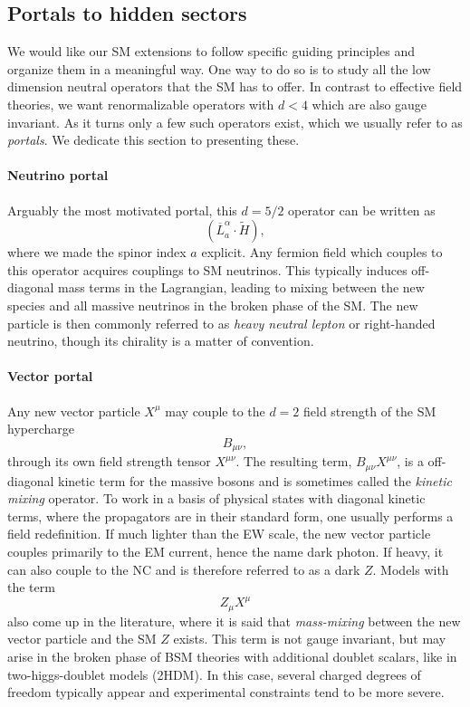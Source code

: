 \subsection{Portals to hidden sectors}

We would like our SM extensions to follow specific guiding principles and organize them in a meaningful way. One way to do so is to study all the low dimension neutral operators that the SM has to offer. In contrast to effective field theories, we want renormalizable operators with $d<4$ which are also gauge invariant. As it turns only a few such operators exist, which we usually refer to as \emph{portals}. We dedicate this section to presenting these.

\paragraph{Neutrino portal} Arguably the most motivated portal, this $d=5/2$ operator can be written as
\begin{equation}
\left( \overline{L}^\alpha_a \cdot \tilde{H}\right), %
\end{equation}
%
where we made the spinor index $a$ explicit. Any fermion field which couples to this operator acquires couplings to SM neutrinos. This typically induces off-diagonal mass terms in the Lagrangian, leading to mixing between the new species and all massive neutrinos in the broken phase of the SM. The new particle is then commonly referred to as \emph{heavy neutral lepton} or right-handed neutrino, though its chirality is a matter of convention.

\paragraph{Vector portal} Any new vector particle $X^\mu$ may couple to the $d=2$ field strength of the SM hypercharge
\begin{equation}
B_{\mu\nu},
\end{equation}
through its own field strength tensor $X^{\mu\nu}$. The resulting term, $B_{\mu\nu} X^{\mu\nu}$, is a off-diagonal kinetic term for the massive bosons and is sometimes called the \emph{kinetic mixing} operator. To work in a basis of physical states with diagonal kinetic terms, where the propagators are in their standard form, one usually performs a field redefinition. If much lighter than the EW scale, the new vector particle couples primarily to the EM current, hence the name dark photon. If heavy, it can also couple to the NC and is therefore referred to as a dark $Z$. Models with the term 
%
\begin{equation}
 Z_\mu X^\mu 
\end{equation}
%
also come up in the literature, where it is said that \emph{mass-mixing} between the new vector particle and the SM $Z$ exists. This term is not gauge invariant, but may arise in the broken phase of BSM theories with additional doublet scalars, like in two-higgs-doublet models (2HDM). In this case, several charged degrees of freedom typically appear and experimental constraints tend to be more severe.

